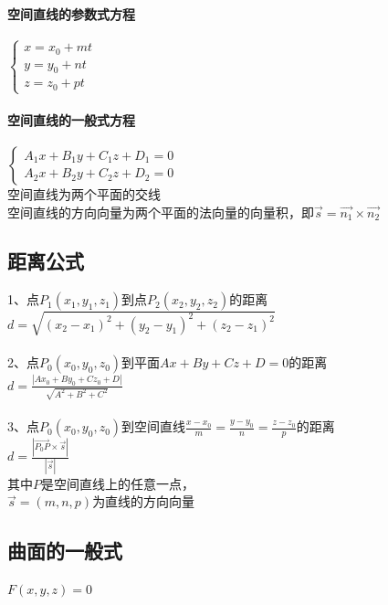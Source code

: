 \documentclass{article}
\begin{document}
\begin{flushleft}
	\paragraph{空间直线的参数式方程}
	$\left\{
	\begin{array}{lcl}
	x=x_0+mt\\
	y=y_0+nt\\
	z=z_0+pt
	\end{array} \right.$\\
	
	\paragraph{空间直线的一般式方程}
	$\left\{
	\begin{array}{lcl}
	A_1x+B_1y+C_1z+D_1=0\\
	A_2x+B_2y+C_2z+D_2=0
	\end{array} \right.$\\
	空间直线为两个平面的交线\\
	空间直线的方向向量为两个平面的法向量的向量积，即$\vec{s}=\vec{n_1}\times\vec{n_2}$\\
	
	\subsection{距离公式}
	
	1、点$P_1(x_1,y_1,z_1)$到点$P_2(x_2,y_2,z_2)$的距离\\$d=\sqrt{(x_2-x_1)^2+(y_2-y_1)^2+(z_2-z_1)^2}$\\~\\
	2、点$P_0(x_0,y_0,z_0)$到平面$Ax+By+Cz+D=0$的距离\\$d=\frac{|Ax_0+By_0+Cz_0+D|}{\sqrt{A^2+B^2+C^2}}$\\~\\
	3、点$P_0(x_0,y_0,z_0)$到空间直线$\frac{x-x_0}{m}=\frac{y-y_0}{n}=\frac{z-z_0}{p}$的距离\\$d=\frac{|\vec{P_0P}\times\vec{s}|}{|\vec{s}|}$\\
	\qquad 其中$P$是空间直线上的任意一点，\\
	\qquad $\vec{s}=(m,n,p)$为直线的方向向量\\
	
	\subsection{曲面的一般式}
	$F(x,y,z)=0$\\
	

\end{flushleft}
\end{document}
